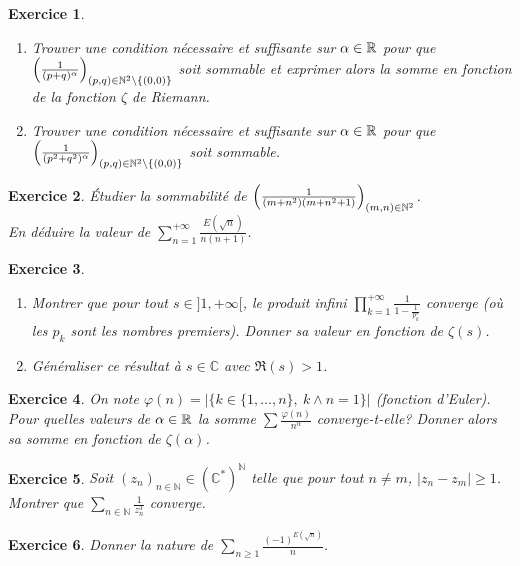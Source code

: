 \documentclass[12pt]{article}
\newtheorem{exercise}{Exercice}[section]
\theoremstyle{remark}
\theoremstyle{remark}
\newcommand{\C}{\mathbb{C}} \newcommand{\Q}{\mathbb{Q}}
\newcommand{\N}{\mathbb{N}} \newcommand{\Z}{\mathbb{Z}}
\begin{document}
\begin{exercise}
	\phantom{}
	\begin{enumerate}
		\item
		Trouver une condition nécessaire et suffisante sur $\alpha\in\mathbb{R}$ pour que
		$\Bigl(\frac{1}{(p+q)^{\alpha}}\Bigr)_{(p,q)\in\N^{2}\setminus\{(0,0)\}}$
		soit sommable et exprimer alors la somme en fonction de la fonction
		$\zeta$ de Riemann.
		\item
		Trouver une condition nécessaire et suffisante sur $\alpha\in\mathbb{R}$ pour que
		$\Bigl(\frac{1}{(p^{2}+q^{2})^{\alpha}}\Bigr)_{(p,q)\in\N^{2}\setminus\{(0,0)\}}$
		soit sommable.
	\end{enumerate}
\end{exercise}

\begin{exercise}
	Étudier la sommabilité de
	$\Bigl(\frac{1}{(m+n^{2})(m+n^{2}+1)}\Bigr)_{(m,n)\in\N^{2}}$.\\
	En déduire la valeur de $\sum_{n=1}^{+\infty}\frac{E(\sqrt{n})}{n(n+1)}$.
\end{exercise}

\begin{exercise}
	\phantom{}
	\begin{enumerate}
		\item
		Montrer que pour tout $s\in]1,+\infty[$, le produit infini
		$\prod_{k=1}^{+\infty}\frac{1}{1-\frac{1}{p_{k}^{s}}}$ converge (où les
		$p_{k}$ sont les nombres premiers). Donner sa valeur en fonction de
		$\zeta(s)$.
		\item
		Généraliser ce résultat à $s\in\C$ avec $\Re(s)>1$.
	\end{enumerate}
\end{exercise}

\begin{exercise}
	On note $\varphi(n)=\vert\{k\in\{1,\dots,n\},~k\wedge n=1\}\vert$ (fonction
	d'Euler). Pour quelles valeurs de $\alpha\in\mathbb{R}$ la somme $\sum
	\frac{\varphi(n)}{n^{\alpha}}$ converge-t-elle? Donner alors sa somme en
	fonction de $\zeta(\alpha)$.
\end{exercise}

\begin{exercise}
	Soit $(z_{n})_{n\in\N}\in(\C^{*})^{\N}$ telle que pour tout $n\neq m$, $\vert
	z_{n}-z_{m}\vert\geqslant1$. Montrer que $\sum_{n\in\N}\frac{1}{z_{n}^{3}}$
	converge.
\end{exercise}

\begin{exercise}
	Donner la nature de $\sum_{n\geqslant1}\frac{(-1)^{E(\sqrt{n})}}{n}$.
\end{exercise}
\end{document}
